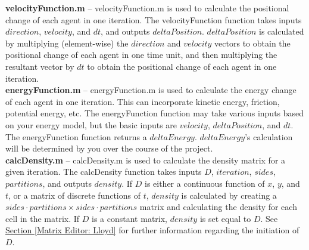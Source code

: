 \documentclass[../CourseManual.tex]{subfiles}
\begin{document}
\textbf{velocityFunction.m} -- velocityFunction.m is used to calculate the positional change of each agent in one iteration. The velocityFunction function takes inputs $direction$, $velocity$, and $dt$, and outputs $deltaPosition$. $deltaPosition$ is calculated by multiplying (element-wise) the $direction$ and $velocity$ vectors to obtain the positional change of each agent in one time unit, and then multiplying the resultant vector by $dt$ to obtain the positional change of each agent in one iteration. \\

\textbf{energyFunction.m} -- energyFunction.m is used to calculate the energy change of each agent in one iteration. This can incorporate kinetic energy, friction, potential energy, etc. The energyFunction function may take various inputs based on your energy model, but the basic inputs are $velocity$, $deltaPosition$, and $dt$. The energyFunction function returns a $deltaEnergy$. $deltaEnergy$'s calculation will be determined by you over the course of the project. \\

\textbf{calcDensity.m} -- calcDensity.m is used to calculate the density matrix for a given iteration. The calcDensity function takes inputs $D$, $iteration$, $sides$, $partitions$, and outputs $density$. If $D$ is either a continuous function of $x$, $y$, and $t$, or a matrix of discrete functions of $t$, $density$ is calculated by creating a $sides \cdot partitions \times sides \cdot partitions$ matrix and calculating the density for each cell in the matrix. If $D$ is a constant matrix, $density$ is set equal to $D$. See \hyperref[Matrix Editor: Lloyd]{Section \ref{Matrix Editor: Lloyd}} for further information regarding the initiation of $D$. \\



\end{document}
